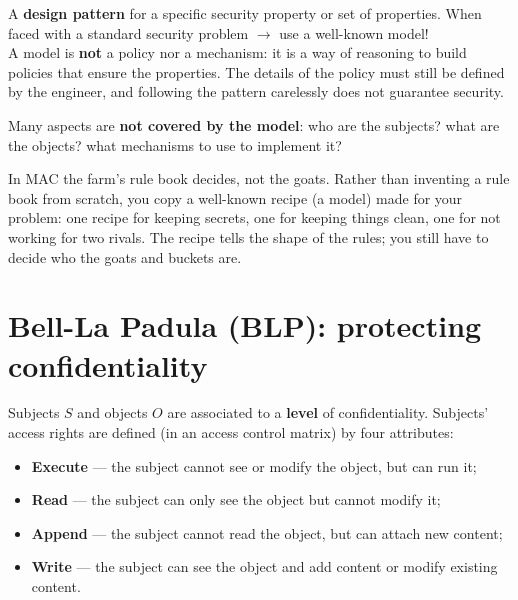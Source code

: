 \begin{defnbox}[title=Security model]
A \textbf{design pattern} for a specific security property or set of properties. When
faced with a standard security problem $\to$ use a well-known model! \\
A model is \textbf{not} a policy nor a mechanism: it is a way of reasoning to build policies that
ensure the properties. The details of the policy must still be defined by the engineer, and
following the pattern carelessly does not guarantee security.
\end{defnbox}

\begin{warnbox}[title=The devil is in the details]
Many aspects are \textbf{not covered by the model}: who are the subjects? what are the
objects? what mechanisms to use to implement it?
\end{warnbox}

\begin{goatbox}
In MAC the farm's rule book decides, not the goats. Rather than inventing a rule book from
scratch, you copy a well-known recipe (a model) made for your problem: one recipe for keeping
secrets, one for keeping things clean, one for not working for two rivals. The recipe tells the
shape of the rules; you still have to decide who the goats and buckets are.
\end{goatbox}

\section{Bell-La Padula (BLP): protecting confidentiality}

\begin{defnbox}[title=Bell-La Padula model (BLP)]
Subjects $S$ and objects $O$ are associated to a \textbf{level} of confidentiality.
Subjects' access rights are defined (in an access control matrix) by four attributes:
\begin{itemize}
  \item \textbf{Execute} --- the subject cannot see or modify the object, but can run it;
  \item \textbf{Read} --- the subject can only see the object but cannot modify it;
  \item \textbf{Append} --- the subject cannot read the object, but can attach new
        content;
  \item \textbf{Write} --- the subject can see the object and add content or modify
        existing content.
\end{itemize}
\end{defnbox}

